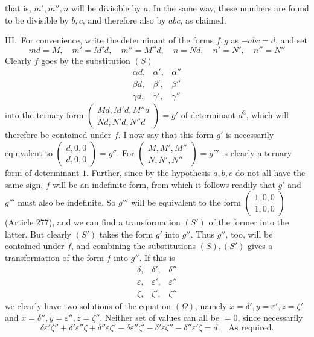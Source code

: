 that is, \(m',m'',n\) will be divisible by \(a\). In the same way,
these numbers are found to be divisible by \(b,c\), and therefore
also by \(abc\), as claimed.
\par
III.\ For convenience, write the determinant of the forms \(f,g\)
as \(-abc=d\), and set
\[
md=M,\quad m'=M'd,\quad m''=M''d,\quad n=Nd,\quad n'=N',\quad n''=N''
\]
Clearly \(f\) goes by the substitution \((S)\)
\[
\begin{array}{ccc}
\alpha d,&\alpha',&\alpha''\\
\beta d,&\beta',&\beta''\\
\gamma d,&\gamma',&\gamma''
\end{array}
\]
into the ternary form \(\left(\begin{smallmatrix}Md,M'd,M''d\\Nd,N'd,N''d\end{smallmatrix}\right)=g'\) of determinant \(d^3\), which will
therefore be contained under \(f\). I now say that this form
\(g'\) is necessarily equivalent to \(\left(\begin{smallmatrix}d,0,0\\d,0,0\end{smallmatrix}\right)=g''\). For \(\left(\begin{smallmatrix}M,M',M''\\N,N',N''\end{smallmatrix}\right)=g'''\) is
clearly a ternary form of determinant \(1\). Further, since by
the hypothesis \(a,b,c\) do not all have the same sign, \(f\)
will be an indefinite form, from which it follows readily that
\(g'\) and \(g'''\) must also be indefinite. So \(g'''\) will
be equivalent to the form \(\left(\begin{smallmatrix}1,0,0\\1,0,0\end{smallmatrix}\right)\) (Article 277), and we can find
a transformation \((S')\) of the former into the latter. But clearly
\((S')\) takes the form \(g'\) into \(g''\). Thus \(g''\), too,
will be contained under \(f\), and combining the substitutions
\((S),(S')\) gives a transformation of the form \(f\) into \(g''\).
If this is
\[
\begin{array}{ccc}
\delta,&\delta',&\delta''\\
\varepsilon,&\varepsilon',&\varepsilon''\\
\zeta,&\zeta',&\zeta''
\end{array}
\]
we clearly have two solutions of the equation \((\Omega)\), namely
\(x=\delta',y=\varepsilon',z=\zeta'\) and \(x=\delta'',y=\varepsilon'',z=\zeta''\). Neither set of values can all be \(=0\),
since necessarily
\[
\delta\varepsilon'\zeta''+\delta'\varepsilon''\zeta+\delta''\varepsilon\zeta'-\delta\varepsilon''\zeta'-\delta'\varepsilon\zeta''-\delta''\varepsilon'\zeta=d.\quad\text{As required.}
\]

